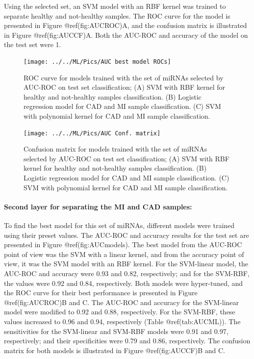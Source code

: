 \documentclass[smallextended]{svjour3}       %
\begin{document}
Using the selected set, an SVM model with an RBF kernel was trained to
separate healthy and not-healthy samples. The ROC curve for the model is
presented in Figure @ref(fig:AUCROC)A, and the confusion matrix is
illustrated in Figure @ref(fig:AUCCF)A. Both the AUC-ROC and accuracy of
the model on the test set were 1.

\begin{figure}

{\centering \texttt{[image: ../../ML/Pics/AUC best model ROCs]} 

}

\caption{ROC curve for models trained with the set of miRNAs selected by AUC-ROC on test set classification; (A) SVM with RBF kernel for healthy and not-healthy samples classification. (B) Logistic regression model for CAD and MI sample classification. (C) SVM with polynomial kernel for CAD and MI sample classification. }\label{fig:AUCROC}
\end{figure}

\begin{figure}

{\centering \texttt{[image: ../../ML/Pics/AUC Conf. matrix]} 

}

\caption{Confusion matrix for models trained with the set of miRNAs selected by AUC-ROC on test set classification; (A) SVM with RBF kernel for healthy and not-healthy samples classification. (B) Logistic regression model for CAD and MI sample classification. (C) SVM with polynomial kernel for CAD and MI sample classification.}\label{fig:AUCCF}
\end{figure}

\hypertarget{second-layer-for-separating-the-mi-and-cad-samples-3}{%
\paragraph{Second layer for separating the MI and CAD
samples:}\label{second-layer-for-separating-the-mi-and-cad-samples-3}}

To find the best model for this set of miRNAs, different models were
trained using their preset values. The AUC-ROC and accuracy results for
the test set are presented in Figure @ref(fig:AUCmodels). The best model
from the AUC-ROC point of view was the SVM with a linear kernel, and
from the accuracy point of view, it was the SVM model with an RBF
kernel. For the SVM-linear model, the AUC-ROC and accuracy were 0.93 and
0.82, respectively; and for the SVM-RBF, the values were 0.92 and 0.84,
respectively. Both models were hyper-tuned, and the ROC curve for their
best performance is presented in Figure @ref(fig:AUCROC)B and C. The
AUC-ROC and accuracy for the SVM-linear model were modified to 0.92 and
0.88, respectively. For the SVM-RBF, these values increased to 0.96 and
0.94, respectively (Table @ref(tab:AUCML)). The sensitivities for the
SVM-linear and SVM-RBF models were 0.91 and 0.97, respectively; and
their specificities were 0.79 and 0.86, respectively. The confusion
matrix for both models is illustrated in Figure @ref(fig:AUCCF)B and C.
\end{document}
